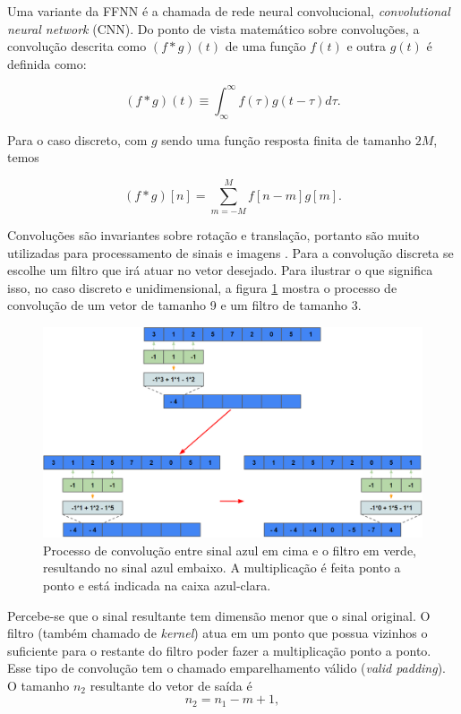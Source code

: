 \documentclass[a4paper,12pt,oneside]{book}
\begin{document}
\par Uma variante da FFNN é a chamada de rede neural convolucional, \textit{convolutional neural network} (CNN). Do ponto de vista matemático sobre convoluções, a convolução descrita como $(f*g)(t)$ de uma função $f(t)$ e outra $g(t)$ é definida como:

\begin{equation}\label{eq:conv_cont}
    (f*g)(t) \equiv \int^{\infty}_{\infty} f(\tau)g(t - \tau)d\tau.
\end{equation}

Para o caso discreto, com $g$ sendo uma função resposta finita de tamanho $2M$, temos

\begin{equation}\label{eq:conv_disc}
    (f*g)[n] = \sum^{M}_{m = -M} f[n - m]g[m]. 
\end{equation}

\par Convoluções são invariantes sobre rotação e translação, portanto são muito utilizadas para processamento de sinais e imagens \cite{signal_book}. Para a convolução discreta se escolhe um filtro que irá atuar no vetor desejado. Para ilustrar o que significa isso, no caso discreto e unidimensional, a figura \ref{fig:conv_valid} mostra o processo de convolução de um vetor de tamanho 9 e um filtro de tamanho 3.

\begin{figure}[H]
    \centering
    \includegraphics[scale = 0.38]{figs/conv_valid.png}
    \caption{Processo de convolução entre sinal azul em cima e o filtro em verde, resultando no sinal azul embaixo. A multiplicação é feita ponto a ponto e está indicada na caixa azul-clara.}
    \label{fig:conv_valid}
\end{figure}

\par Percebe-se que o sinal resultante tem dimensão menor que o sinal original. O filtro (também chamado de \textit{kernel}) atua em um ponto que possua vizinhos o suficiente para o restante do filtro poder fazer a multiplicação ponto a ponto. Esse tipo de convolução tem o chamado emparelhamento válido (\textit{valid padding}). O tamanho $n_2$ resultante do vetor de saída é 
\begin{equation}
    n_2 = n_1 - m + 1,
\end{equation}
\end{document}
